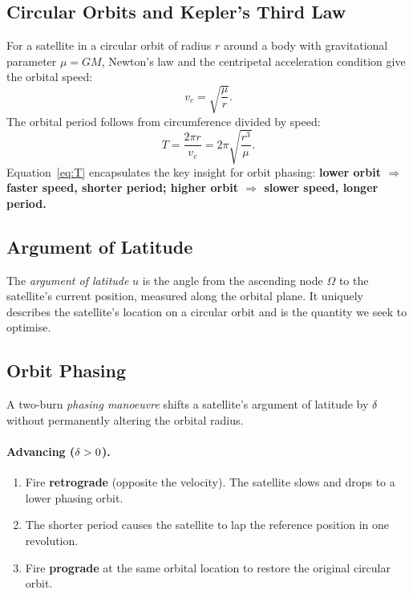 \subsection{Circular Orbits and Kepler's Third Law}

For a satellite in a circular orbit of radius $r$ around a body with
gravitational parameter $\mu = GM$, Newton's law and the centripetal
acceleration condition give the orbital speed:
\begin{equation}
  v_c = \sqrt{\frac{\mu}{r}}.
  \label{eq:vc}
\end{equation}
The orbital period follows from circumference divided by speed:
\begin{equation}
  T = \frac{2\pi r}{v_c} = 2\pi\sqrt{\frac{r^3}{\mu}}.
  \label{eq:T}
\end{equation}
Equation~\eqref{eq:T} encapsulates the key insight for orbit phasing:
\textbf{lower orbit $\Rightarrow$ faster speed, shorter period;
higher orbit $\Rightarrow$ slower speed, longer period.}

\subsection{Argument of Latitude}

The \emph{argument of latitude} $u$ is the angle from the ascending node
$\Omega$ to the satellite's current position, measured along the orbital
plane. It uniquely describes the satellite's location on a circular orbit
and is the quantity we seek to optimise.

\subsection{Orbit Phasing}

A two-burn \emph{phasing manoeuvre} shifts a satellite's argument of
latitude by $\delta$ without permanently altering the orbital radius.

\paragraph{Advancing ($\delta > 0$).}
\begin{enumerate}
  \item Fire \textbf{retrograde} (opposite the velocity). The satellite
        slows and drops to a lower phasing orbit.
  \item The shorter period causes the satellite to lap the reference
        position in one revolution.
  \item Fire \textbf{prograde} at the same orbital location to restore
        the original circular orbit.
\end{enumerate}

